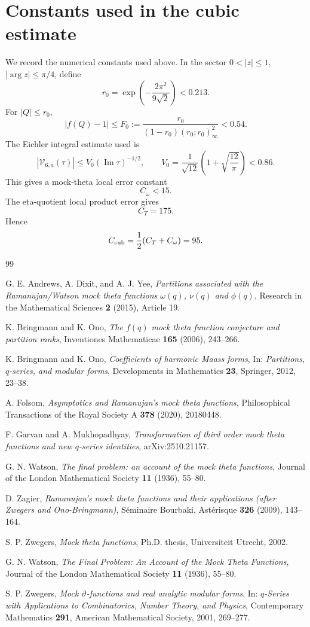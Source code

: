 \documentclass[11pt]{article}
\theoremstyle{remark}
\newcommand{\Impart}{\operatorname{Im}}
\begin{document}
\section{Constants used in the cubic estimate}

We record the numerical constants used above. In the sector $0<|z|\leq1$, $|\arg z|\leq\pi/4$, define
\[
r_0=\exp\left(-\frac{2\pi^2}{9\sqrt2}\right)<0.213.
\]
For $|Q|\leq r_0$,
\[
|f(Q)-1|\leq
F_0:=\frac{r_0}{(1-r_0)(r_0;r_0)_\infty^2}<0.54.
\]
The Eichler integral estimate used is
\[
|\mathcal V_{6,a}(\tau)|\leq V_0(\Impart\tau)^{-1/2},
\qquad
V_0=\frac1{\sqrt{12}}\left(1+\sqrt{\frac{12}{\pi}}\right)<0.86.
\]
This gives a mock-theta local error constant
\[
C_\omega<15.
\]
The eta-quotient local product error gives
\[
C_T=175.
\]
Hence
\[
C_{\rm cub}=\frac12(C_T+C_\omega)=95.
\]


\begin{thebibliography}{99}

G. E. Andrews, A. Dixit, and A. J. Yee,
\emph{Partitions associated with the Ramanujan/Watson mock theta functions $\omega(q)$, $\nu(q)$ and $\phi(q)$},
Research in the Mathematical Sciences \textbf{2} (2015), Article 19.

K. Bringmann and K. Ono,
\emph{The $f(q)$ mock theta function conjecture and partition ranks},
Inventiones Mathematicae \textbf{165} (2006), 243--266.

K. Bringmann and K. Ono,
\emph{Coefficients of harmonic Maass forms},
In: \emph{Partitions, $q$-series, and modular forms}, Developments in Mathematics \textbf{23}, Springer, 2012, 23--38.

A. Folsom,
\emph{Asymptotics and Ramanujan's mock theta functions},
Philosophical Transactions of the Royal Society A \textbf{378} (2020), 20180448.

F. Garvan and A. Mukhopadhyay,
\emph{Transformation of third order mock theta functions and new $q$-series identities},
arXiv:2510.21157.

G. N. Watson,
\emph{The final problem: an account of the mock theta functions},
Journal of the London Mathematical Society \textbf{11} (1936), 55--80.

D. Zagier,
\emph{Ramanujan's mock theta functions and their applications (after Zwegers and Ono-Bringmann)},
S\'eminaire Bourbaki, Ast\'erisque \textbf{326} (2009), 143--164.

S. P. Zwegers,
\emph{Mock theta functions},
Ph.D. thesis, Universiteit Utrecht, 2002.


G. N. Watson,
\emph{The Final Problem: An Account of the Mock Theta Functions},
Journal of the London Mathematical Society \textbf{11} (1936), 55--80.

S. P. Zwegers,
\emph{Mock $\vartheta$-functions and real analytic modular forms},
In: \emph{$q$-Series with Applications to Combinatorics, Number Theory, and Physics}, Contemporary Mathematics \textbf{291}, American Mathematical Society, 2001, 269--277.

\end{thebibliography}
\end{document}
